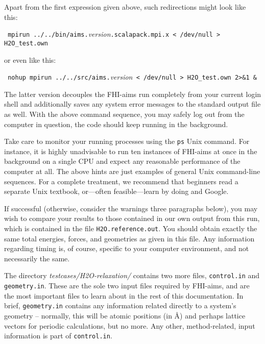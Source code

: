   Apart from the first expression given above, such 
  redirections might look like this: 

  {
    \verb+ mpirun ../../bin/aims.+\emph{version}\verb+.scalapack.mpi.x < /dev/null > H2O_test.own+
  }

  or even like this: 

  {
    \verb+ nohup mpirun ../../src/aims.+\emph{version}\verb+ < /dev/null > H2O_test.own 2>&1 &+
  }

  The latter version decouples the FHI-aims run completely from your
  current login shell and additionally
  saves any system error messages to the standard output file as well. With the above command sequence,
  you may safely log out from the computer in question, the code should keep running in the background. 

  Take care to monitor your running processes using the \texttt{ps} Unix command. For instance, it is
  highly unadvisable to run ten instances of FHI-aims at once in the background on a single CPU and expect
  any reasonable performance of the computer at all. The above hints
  are just examples of general Unix command-line sequences. For a complete treatment, we
  recommend that beginners read a separate Unix textbook, or---often feasible---learn by doing and Google. 

If successful (otherwise, consider the warnings three paragraphs below), you
may wish to compare your results to those contained in our 
own output from this run, which is contained in the file
\texttt{H2O.reference.out}. You should obtain exactly the same total energies,
forces, and geometries as given in this file. Any information regarding timing
is, of course, specific to your computer environment, and not necessarily the
same. 

The directory \emph{testcases/H2O-relaxation/} contains two more files,
\texttt{control.in} and \linebreak[4] \texttt{geometry.in}. These are the sole two input
files required by FHI-aims, and are the most important files to learn about in
the rest of this documentation. In brief, \texttt{geometry.in} contains any
information related directly to a system's geometry -- normally, this will be
atomic positions (in \AA) and perhaps lattice vectors for periodic
calculations, but no more. Any other, method-related, input information is
part of \texttt{control.in}. 

